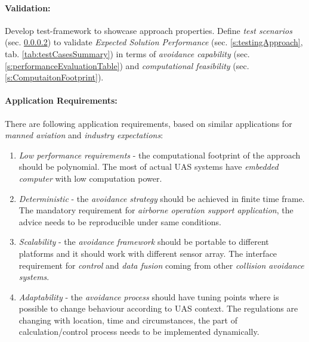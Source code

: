 \paragraph{Validation:} Develop test-framework to showcase approach properties. Define \emph{test scenarios} (sec. \ref{}) to validate \emph{Expected Solution Performance} (sec. \ref{s:testingApproach}, tab. \ref{tab:testCasesSummary}) in terms of \emph{avoidance capability} (sec. \ref{s:performanceEvaluationTable}) and \emph{computational feasibility} (sec. \ref{s:ComputaitonFootprint}).

\paragraph{Application Requirements:} There are  following application requirements, based on similar applications for \emph{manned aviation} and \emph{industry expectations}:

\begin{enumerate}
    \item \emph{Low performance requirements} - the computational footprint of the approach should be polynomial. The most of actual UAS systems have \emph{embedded computer} with low computation power.
    
    \item \emph{Deterministic} - the \emph{avoidance strategy} should be achieved in finite time frame. The mandatory requirement for \emph{airborne operation support application}, the advice needs to be reproducible under same conditions.
    
    \item \emph{Scalability} - the \emph{avoidance framework} should be portable to different platforms and it should work with different sensor array. The interface requirement for \emph{control} and \emph{data fusion} coming from other \emph{collision avoidance systems}.
    
    \item \emph{Adaptability} - the \emph{avoidance process} should have tuning points where is possible to change behaviour according to UAS context. The regulations are changing with location, time and circumstances, the part of calculation/control process needs to be implemented dynamically.
\end{enumerate}